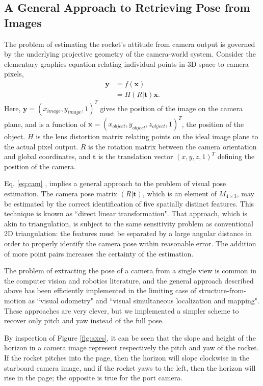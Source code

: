 \documentclass{article}
\begin{document}
\subsection{A General Approach to Retrieving Pose from Images}
\label{sec:image_posest}

The problem of estimating the rocket's attitude from camera output is governed by the underlying projective geometry of the camera-world system. Consider the elementary graphics equation relating individual points in 3D space to camera pixels,
\begin{align}
\label{eq:cam}
\mathbf{y} &= f(\mathbf{x}) \\
&= H (R | \mathbf{t}) \mathbf{x}.
\end{align}
Here, $\mathbf{y} = (x_{image}, y_{image}, 1)^T$ gives the position of the image on the camera plane, and is a function of $\mathbf{x} = (x_{object}, y_{object}, z_{object}, 1)^T$, the position of the object. $H$ is the lens distortion matrix relating points on the ideal image plane to the actual pixel output. $R$ is the rotation matrix between the camera orientation and global coordinates, and $\mathbf{t}$ is the translation vector $(x, y, z, 1)^T$ defining the position of the camera.

Eq. \ref{eq:cam} , implies a general approach to the problem of visual pose estimation. The camera pose matrix $(R | \mathbf{t})$, which is an element of $M_{4\times3}$, may be estimated by the correct identification of five spatially distinct features. This technique is known as ``direct linear transformation". That approach, which is akin to triangulation, is subject to the same sensitivity problem as conventional 2D triangulation: the features must be separated by a large angular distance in order to properly identify the camera pose within reasonable error. The addition of more point pairs increases the certainty of the estimation.

The problem of extracting the pose of a camera from a single view is common in the computer vision and robotics literature, and the general approach described above has been efficiently implemented in the limiting case of structure-from-motion as ``visual odometry" and ``visual simultaneous localization and mapping". These approaches are very clever, but we implemented a simpler scheme to recover only pitch and yaw instead of the full pose.

By inspection of Figure \ref{fig:axes}, it can be seen that the slope and height of the horizon in a camera image represent respectively the pitch and yaw of the rocket. If the rocket pitches into the page, then the horizon will slope clockwise in the starboard camera image, and if the rocket yaws to the left, then the horizon will rise in the page; the opposite is true for the port camera. 
\end{document}
